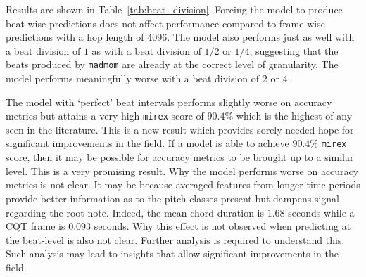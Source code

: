 Results are shown in Table~\ref{tab:beat_division}. Forcing the model to produce beat-wise predictions does not affect performance compared to frame-wise predictions with a hop length of $4096$. The model also performs just as well with a beat division of $1$ as with a beat division of $1/2$ or $1/4$, suggesting that the beats produced by \texttt{madmom} are already at the correct level of granularity. The model performs meaningfully worse with a beat division of $2$ or $4$. 

The model with `perfect' beat intervals performs slightly worse on accuracy metrics but attains a very high \texttt{mirex} score of $90.4\%$ which is the highest of any seen in the literature. This is a new result which provides sorely needed hope for significant improvements in the field. If a model is able to achieve $90.4\%$ \texttt{mirex} score, then it may be possible for accuracy metrics to be brought up to a similar level. This is a very promising result. Why the model performs worse on accuracy metrics is not clear. It may be because averaged features from longer time periods provide better information as to the pitch classes present but dampens signal regarding the root note. Indeed, the mean chord duration is $1.68$ seconds while a CQT frame is $0.093$ seconds. Why this effect is not observed when predicting at the beat-level is also not clear. Further analysis is required to understand this. Such analysis may lead to insights that allow significant improvements in the field.

